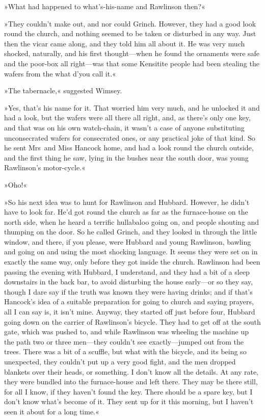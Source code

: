 »What had happened to what's-his-name and Rawlinson then?«

»They couldn't make out, and nor could Grinch. However, they had a good look round the church, and nothing seemed to be taken or disturbed in any way. Just then the vicar came along, and they told him all about it. He was very much shocked, naturally, and his first thought—when he found the ornaments were safe and the poor-box all right—was that some Kensitite people had been stealing the wafers from the what d'you call it.«

»The tabernacle,« suggested Wimsey.

»Yes, that's his name for it. That worried him very much, and he unlocked it and had a look, but the wafers were all there all right, and, as there's only one key, and that was on his own watch-chain, it wasn't a case of anyone substituting unconsecrated wafers for consecrated ones, or any practical joke of that kind. So he sent Mrs~and Miss Hancock home, and had a look round the church outside, and the first thing he saw, lying in the bushes near the south door, was young Rawlinson's motor-cycle.«

»Oho!«

»So his next idea was to hunt for Rawlinson and Hubbard. However, he didn't have to look far. He'd got round the church as far as the furnace-house on the north side, when he heard a terrific hullabaloo going on, and people shouting and thumping on the door. So he called Grinch, and they looked in through the little window, and there, if you please, were Hubbard and young Rawlinson, bawling and going on and using the most shocking language. It seems they were set on in exactly the same way, only before they got inside the church. Rawlinson had been passing the evening with Hubbard, I understand, and they had a bit of a sleep downstairs in the back bar, to avoid disturbing the house early—or so they say, though I dare say if the truth was known they were having drinks; and if that's Hancock's idea of a suitable preparation for going to church and saying prayers, all I can say is, it isn't mine. Anyway, they started off just before four, Hubbard going down on the carrier of Rawlinson's bicycle. They had to get off at the south gate, which was pushed to, and while Rawlinson was wheeling the machine up the path two or three men—they couldn't see exactly—jumped out from the trees. There was a bit of a scuffle, but what with the bicycle, and its being so unexpected, they couldn't put up a very good fight, and the men dropped blankets over their heads, or something. I don't know all the details. At any rate, they were bundled into the furnace-house and left there. They may be there still, for all I know, if they haven't found the key. There should be a spare key, but I don't know what's become of it. They sent up for it this morning, but I haven't seen it about for a long time.«

